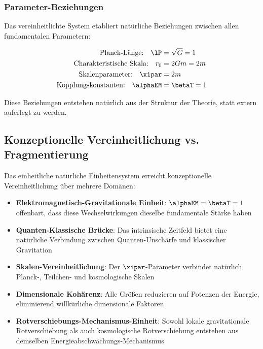 	\subsubsection{Parameter-Beziehungen}
	\label{subsubsec:parameter_relationships}
	
	Das vereinheitlichte System etabliert natürliche Beziehungen zwischen allen fundamentalen Parametern:
	
	\begin{align}
		\text{Planck-Länge:} \quad \lP &= \sqrt{G} = 1 \nonumber\\
		\text{Charakteristische Skala:} \quad r_0 &= 2Gm = 2m \nonumber\\
		\text{Skalenparameter:} \quad \xipar &= 2m \nonumber\\
		\text{Kopplungskonstanten:} \quad \alphaEM &= \betaT = 1 \nonumber
	\end{align}
	
	Diese Beziehungen entstehen natürlich aus der Struktur der Theorie, statt extern auferlegt zu werden.
	
	\subsection{Konzeptionelle Vereinheitlichung vs. Fragmentierung}
	\label{subsec:unification_fragmentation}
	
	Das einheitliche natürliche Einheitensystem erreicht konzeptionelle Vereinheitlichung über mehrere Domänen:
	
	\begin{itemize}
		\item \textbf{Elektromagnetisch-Gravitationale Einheit}: $\alphaEM = \betaT = 1$ offenbart, dass diese Wechselwirkungen dieselbe fundamentale Stärke haben
		\item \textbf{Quanten-Klassische Brücke}: Das intrinsische Zeitfeld bietet eine natürliche Verbindung zwischen Quanten-Unschärfe und klassischer Gravitation
		\item \textbf{Skalen-Vereinheitlichung}: Der $\xipar$-Parameter verbindet natürlich Planck-, Teilchen- und kosmologische Skalen
		\item \textbf{Dimensionale Kohärenz}: Alle Größen reduzieren auf Potenzen der Energie, eliminierend willkürliche dimensionale Faktoren
		\item \textbf{Rotverschiebungs-Mechanismus-Einheit}: Sowohl lokale gravitationale Rotverschiebung als auch kosmologische Rotverschiebung entstehen aus demselben Energieabschwächungs-Mechanismus
	\end{itemize}
	
